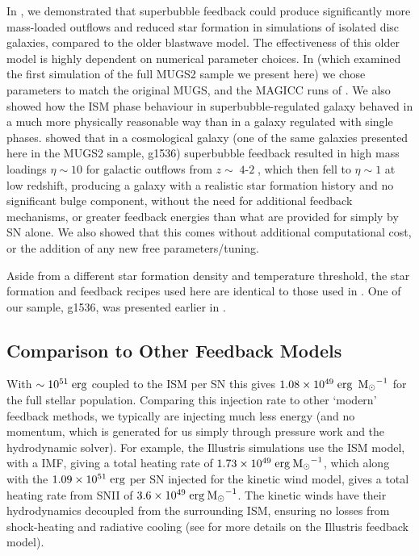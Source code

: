In \citet{Keller2014}, we demonstrated that superbubble feedback could produce
significantly more mass-loaded outflows and reduced star formation in
simulations of isolated disc galaxies, compared to the older \citep{Stinson2006}
blastwave model.  The effectiveness of this older model is highly dependent on
numerical parameter choices.  In \citet{Keller2015} (which examined the first
simulation of the full MUGS2 sample we present here) we chose parameters to
match the original MUGS, and the MAGICC runs of \citet{Stinson2013}. We also
showed how the ISM phase behaviour in superbubble-regulated galaxy behaved in a
much more physically reasonable way than in a galaxy regulated with single
phases.  \citet{Keller2015} showed that in a cosmological galaxy (one of the
same galaxies presented here in the MUGS2 sample, g1536) superbubble feedback
resulted in high mass loadings $\eta\sim10 $ for galactic outflows from
$z\sim\operatorname{4-2}$, which then fell to $\eta\sim1$ at low redshift, producing a galaxy
with a realistic star formation history and no significant bulge component,
without the need for additional feedback mechanisms, or greater feedback
energies than what are provided for simply by SN alone.  We also showed that
this comes without additional computational cost, or the addition of any new
free parameters/tuning.

Aside from a different star formation density and temperature threshold, the
star formation and feedback recipes used here are identical to those used in
\citet{Keller2014}.  One of our sample, g1536, was presented earlier in
\citet{Keller2015}.

\subsection{Comparison to Other Feedback Models}
With $\sim10^{51}\; \rm{erg}$ coupled to the ISM per SN this gives
$1.08\times10^{49}\; \rm{erg}\;\>{\rm M_{\odot}}^{-1}$ for the full stellar population.
Comparing this injection rate to other `modern' feedback methods, we typically
are injecting much less energy (and no momentum, which is generated for us
simply through pressure work and the hydrodynamic solver).  For example, the
Illustris simulations \citep{Vogelsberger2014b} use the \citet{Springel2003} ISM
model, with a \citet{Chabrier2003} IMF, giving a total heating rate of
$1.73\times10^{49}\; \rm{erg}\>{\rm M_{\odot}}^{-1}$, which along with the
$1.09\times10^{51}\;\rm{erg}$ per SN injected for the kinetic wind model, gives
a total heating rate from SNII of $3.6\times10^{49}\;\rm{erg}\>{\rm M_{\odot}}^{-1}$.  The
kinetic winds have their hydrodynamics decoupled from the surrounding ISM,
ensuring no losses from shock-heating and radiative cooling (see
\citealt{Vogelsberger2013,Vogelsberger2014a} for more details on the Illustris
feedback model).  

